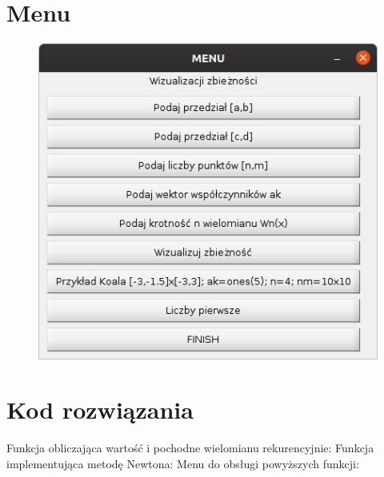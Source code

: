 \documentclass[10pt]{article}   %
\begin{document}
\section{Menu}
\begin{figure}[ht]
\begin{center}
\advance\leftskip-3cm
\advance\rightskip-3cm
\includegraphics[keepaspectratio=true,scale=0.6]{menu.png}

\end{center}\end{figure}
\newpage


\section{Kod rozwiązania} 
Funkcja obliczająca wartość i pochodne wielomianu rekurencyjnie:\newline
\newpage
Funkcja implementująca metodę Newtona:\newline 
\newpage
Menu do obsługi powyższych funkcji: \newline

\end{document}
